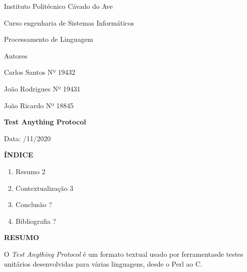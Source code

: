 \documentclass{article}
\begin{document}
\centerline{Instituto Politécnico Cávado do Ave \linebreak}
\vspace*{1 em}
\centerline{Curso engenharia de Sistemas Informáticos \linebreak}
\vspace*{1 em}
\centerline{Processamento de Linguagem \linebreak}
\vspace*{5 em}

\centerline{Autores}

\vspace*{3 em}
\centerline{Carlos Santos Nº 19432\linebreak}
\vspace*{1 em}
\centerline{João Rodrigues Nº 19431\linebreak}
\vspace*{1 em}
\centerline{João Ricardo Nº 18845 \linebreak}
\vspace*{3 em}

\centerline{\textbf{Test Anything Protocol}}

\vspace*{10 em}
\centerline{Data: /11/2020}

\newpage
\centerline{\textbf{ÍNDICE}}
\vspace*{3 em}

\begin{enumerate}
	\item Resumo \hspace{30 em} 2 \\
	\item Contextualização \hspace{26 em} 3\\
	\item Conclusão \hspace{29 em} ? \\
	\item Bibliografia\hspace{28,75 em} ? \\
\end{enumerate}

\newpage
\centerline{\textbf{RESUMO}}

\vspace*{3 em}
O \textit{Test Anything Protocol} é um formato textual usado por ferramentasde testes unitários desenvolvidas
para várias linguagens, desde o Perl ao C. \linebreak
\vspace*{1 em}
\end{document}
